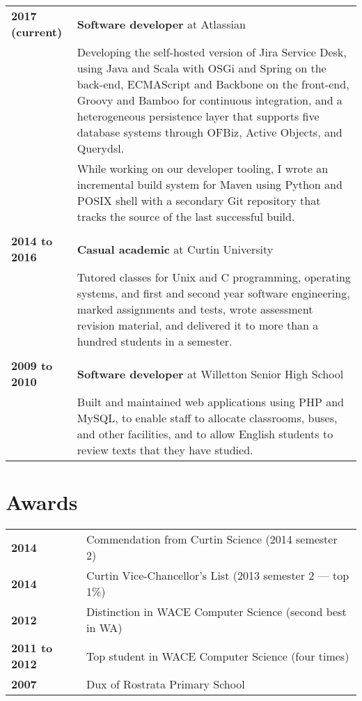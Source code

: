 \documentclass[a4paper,12pt]{article}
\begin{document}
\begin{tabular}{p{35mm}p{125mm}}
	                    \textbf{2017 (current)}     & \textbf{Software developer} at Atlassian
	\vspace{0.2em}  \\                              & Developing the self-hosted version of Jira Service Desk, using Java and Scala with OSGi and Spring on the back-end, ECMAScript and Backbone on the front-end, Groovy and Bamboo for continuous integration, and a heterogeneous persistence layer that supports five database systems through OFBiz, Active Objects, and Querydsl.
    \vspace{0.2em}  \\                              & While working on our developer tooling, I wrote an incremental build system for Maven using Python and POSIX shell with a secondary Git repository that tracks the source of the last successful build.
	\\              \\  \textbf{2014 to 2016}       & \textbf{Casual academic} at Curtin University
	\vspace{0.2em}  \\                              & Tutored classes for Unix and C programming, operating systems, and first and second year software engineering, marked assignments and tests, wrote assessment revision material, and delivered it to more than a hundred students in a semester.
	\\              \\  \textbf{2009 to 2010}       & \textbf{Software developer} at Willetton Senior High School
	\vspace{0.2em}  \\                              & Built and maintained web applications using PHP and MySQL, to enable staff to allocate classrooms, buses, and other facilities, and to allow English students to review texts that they have studied.
\end{tabular}

\section*{Awards}

\begin{tabular}{p{35mm}p{125mm}}
	                    \textbf{2014}               & Commendation from Curtin Science (2014 semester 2)
	\vspace{0.2em}  \\  \textbf{2014}               & Curtin Vice-Chancellor's List (2013 semester 2 --- top 1\%)
	\vspace{0.2em}  \\  \textbf{2012}               & Distinction in WACE Computer Science (second best in WA)
	\vspace{0.2em}  \\  \textbf{2011 to 2012}       & Top student in WACE Computer Science (four times)
	\vspace{0.2em}  \\  \textbf{2007}               & Dux of Rostrata Primary School
\end{tabular}
\end{document}
